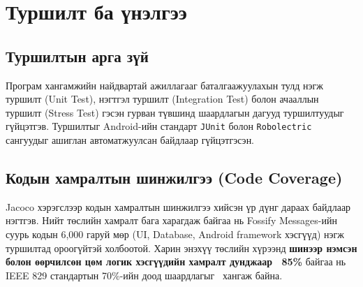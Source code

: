 \chapter{Туршилт ба үнэлгээ}

\section{Туршилтын арга зүй}
Програм хангамжийн найдвартай ажиллагааг баталгаажуулахын тулд нэгж туршилт (Unit Test), нэгтгэл туршилт (Integration Test) болон ачааллын туршилт (Stress Test) гэсэн гурван түвшинд шаардлагын \cite{ieee829} дагууд туршилтуудыг гүйцэтгэв. Туршилтыг Android-ийн стандарт \texttt{JUnit} \cite{junit5} болон \texttt{Robolectric} сангуудыг ашиглан автоматжуулсан байдлаар гүйцэтгэсэн.
\section{Кодын хамралтын шинжилгээ (Code Coverage)}

Jacoco \cite{jacoco_report} хэрэгслээр кодын хамралтын шинжилгээ хийсэн үр дүнг
дараах байдлаар нэгтгэв. Нийт төслийн хамралт бага харагдаж
байгаа нь Fossify Messages-ийн суурь кодын 6,000 гаруй мөр
(UI, Database, Android framework хэсгүүд) нэгж туршилтад
ороогүйтэй холбоотой. Харин энэхүү төслийн хүрээнд
\textbf{шинээр нэмсэн болон өөрчилсөн цөм логик хэсгүүдийн
хамралт дунджаар ~85\%} байгаа нь IEEE 829 стандартын
70\%-ийн доод шаардлагыг~\cite{ieee830} хангаж байна.

\begin{table}[H]
    \centering
    \caption{Jacoco кодын хамралтын шинжилгээний нэгтгэл}
    \label{table:coverage}
\end{table}

